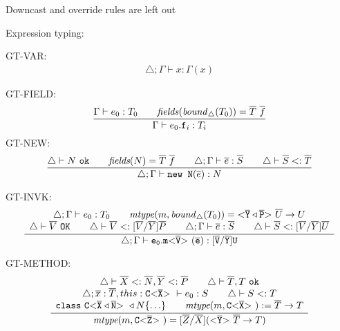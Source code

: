 Downcast and override rules are left out

Expression typing:

GT-VAR:
\begin{align*}
\triangle ; \Gamma \vdash x : \Gamma(x)
\end{align*}


GT-FIELD:
\begin{align*}
\frac{\displaystyle \Gamma \vdash e_0:T_0 \quad \quad \mathit{fields}(\mathit{bound}_\triangle(T_0)) = \overline{T} \ \overline{f}}{\displaystyle \Gamma \vdash e_0.\mathtt{f}_i : T_i}
\end{align*}
GT-NEW:
\begin{align*}
  \frac{\displaystyle \triangle \vdash N \ \texttt{ok} \quad \quad \textit{fields}(N) = \overline{T}\ \overline{f} \quad \quad
  \triangle; \Gamma \vdash \overline{e} : \overline{S} \quad \quad \triangle \vdash \overline{S} <: \overline{T}
}{\displaystyle 
  \triangle; \Gamma \vdash \texttt{new N}(\overline{e}): N
}
\end{align*}


GT-INVK:
\begin{align*}
\frac{\displaystyle \begin{array}{c}
\triangle; \Gamma \vdash e_0 : T_0 \quad \quad \mathit{mtype}(m, \mathit{bound}_\triangle (T_0))=\mathtt{ {\tt <} \overline{Y} \triangleleft \overline{P} {\tt >} \ } \overline{U} \to U\\
\triangle \vdash \overline{V} \ \texttt{OK} \quad \quad
\triangle \vdash \overline{V} <: [\overline{V}/\overline{Y}]\overline{P} \quad \quad
\triangle; \Gamma \vdash \overline{e} : \overline{S} \quad \quad
\triangle \vdash \overline{S} <: [\overline{V}/\overline{Y}]\overline{U}
\end{array}}{\displaystyle \triangle; \Gamma \vdash \mathtt{e_0.\mathtt{m {\tt <} \overline{V} {\tt >} \ }(\overline{e}) : [\overline{V}/\overline{Y}]U }}
\end{align*}


GT-METHOD:
\begin{align*}
\frac{\displaystyle \begin{array}{c}
\triangle \vdash \overline{X} <: \overline{N}, \overline{Y} <: \overline{P}  \quad \quad 
\triangle \vdash \overline{T}, T \ \texttt{ok} \\
\triangle ; \overline{x}:\overline{T}, this : \mathtt{C {\tt <} \overline{X} {\tt >} \ } \vdash e_0 : S \quad \quad
\triangle \vdash S <: T \\
\texttt{class}\ \mathtt{C {\tt <} \overline{X} \triangleleft \overline{N} {\tt >} \ } \triangleleft N \{ \ldots \} \quad \quad
\textit{mtype}(m, \mathtt{C {\tt <} \overline{X} {\tt >} \ }) := \overline{T} \to T \\
\end{array}}{\displaystyle 
\textit{mtype}(m, \mathtt{C {\tt <} \overline{Z} {\tt >} \ }) = [\overline{Z} / \overline{X}](\mathtt{ {\tt <} \overline{Y} {\tt >} \ } \overline{T} \to T)
}
\end{align*}

